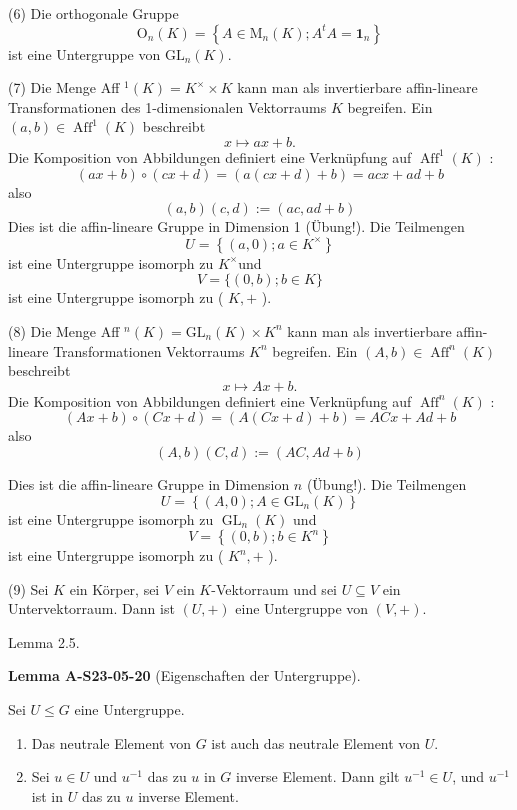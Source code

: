 \documentclass[10pt, letterpaper]{article}
\newcommand{\CustomHeading}[3]{%
  \par\medskip\noindent%
  \textbf{#1 #2} \textnormal{(#3)}.\enskip%
}
\newenvironment{LEM}[2]{\begin{unitbox}\CustomHeading{Lemma}{#1}{#2}}{\end{unitbox}}
\begin{document}
(6) Die orthogonale Gruppe
$$
\mathrm{O}_{n}(K)=\left\{A \in \mathrm{M}_{n}(K) ; A^{t} A=\mathbf{1}_{n}\right\}
$$
ist eine Untergruppe von $\mathrm{GL}_{n}(K)$.


(7) Die Menge Aff ${ }^{1}(K)=K^{\times} \times K$ kann man als invertierbare affin-lineare Transformationen des 1-dimensionalen Vektorraums $K$ begreifen. Ein $(a, b) \in \operatorname{Aff}^{1}(K)$ beschreibt
$$
x \mapsto a x+b .
$$
Die Komposition von Abbildungen definiert eine Verknüpfung auf $\operatorname{Aff}^{1}(K)$ :
$$
(a x+b) \circ(c x+d)=(a(c x+d)+b)=a c x+a d+b
$$
also
$$
(a, b)(c, d):=(a c, a d+b)
$$
Dies ist die affin-lineare Gruppe in Dimension 1 (Übung!). Die Teilmengen
$$
U=\left\{(a, 0) ; a \in K^{\times}\right\}
$$
ist eine Untergruppe isomorph zu $K^{\times}$und
$$
V=\{(0, b) ; b \in K\}
$$
ist eine Untergruppe isomorph zu ( $K,+$ ).


(8) Die Menge Aff ${ }^{n}(K)=\mathrm{GL}_{n}(K) \times K^{n}$ kann man als invertierbare affin-lineare Transformationen Vektorraums $K^{n}$ begreifen. Ein $(A, b) \in \operatorname{Aff}^{n}(K)$ beschreibt
$$
x \mapsto A x+b .
$$
Die Komposition von Abbildungen definiert eine Verknüpfung auf $\operatorname{Aff}^{n}(K)$ :
$$
(A x+b) \circ(C x+d)=(A(C x+d)+b)=A C x+A d+b
$$
also
$$
(A, b)(C, d):=(A C, A d+b)
$$

Dies ist die affin-lineare Gruppe in Dimension $n$ (Übung!). Die Teilmengen
$$
U=\left\{(A, 0) ; A \in \mathrm{GL}_{n}(K)\right\}
$$
ist eine Untergruppe isomorph zu $\operatorname{GL}_{n}(K)$ und
$$
V=\left\{(0, b) ; b \in K^{n}\right\}
$$
ist eine Untergruppe isomorph zu ( $K^{n},+$ ).


(9) Sei $K$ ein Körper, sei $V$ ein $K$-Vektorraum und sei $U \subseteq V$ ein Untervektorraum. Dann ist $(U,+)$ eine Untergruppe von $(V,+)$.



Lemma 2.5. 


\begin{LEM}{A-S23-05-20}{Eigenschaften der Untergruppe}
Sei $U \leq G$ eine Untergruppe.
\begin{enumerate}
  \item Das neutrale Element von $G$ ist auch das neutrale Element von $U$.

  \item Sei $u \in U$ und $u^{-1}$ das zu $u$ in $G$ inverse Element. Dann gilt $u^{-1} \in U$, und $u^{-1}$ ist in $U$ das zu $u$ inverse Element.
\end{enumerate}
\end{LEM}
\end{document}
